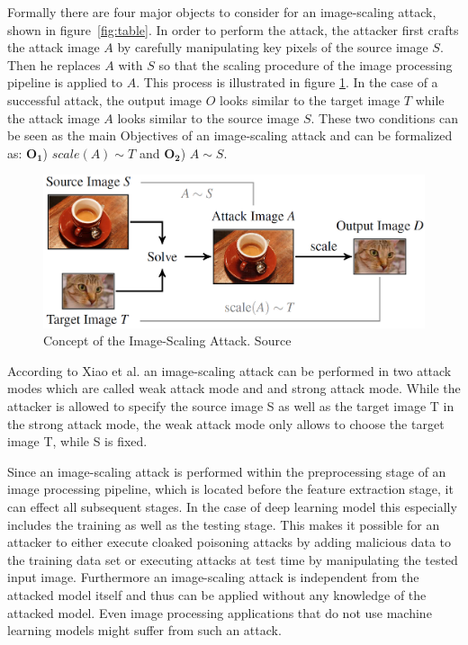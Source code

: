 \documentclass[sigconf]{acmart}
\begin{document}
Formally there are four major objects to consider for an image-scaling attack, shown in figure~\ref{fig:table}.
In order to perform the attack, the attacker first crafts the attack image $A$ by carefully manipulating key pixels of the source image $S$.
Then he replaces $A$ with $S$ so that the scaling procedure of the image processing pipeline is applied to $A$.
This process is illustrated in figure \ref{fig:conc}.
In the case of a successful attack, the output image $O$ looks similar to the target image $T$ while the attack image $A$ looks similar to the source image $S$.
These two conditions can be seen as the main Objectives of an image-scaling attack and can be formalized as:
$\boldsymbol{O_1}$) $scale(A) \sim T$ and $\boldsymbol{O_2}$) $A \sim S$.

\begin{figure}[h]
  \centering
  \includegraphics[width=\linewidth]{img/img_scale_concept.png}
  \caption{Concept of the Image-Scaling Attack. Source \cite{imgscale}}
  \Description{}
  \label{fig:conc}
\end{figure}

According to Xiao et al.\cite{camouflage} an image-scaling attack can be performed in two attack modes which are called weak attack mode and and strong attack mode.
While the attacker is allowed to specify the source image S as well as the target image T in the strong attack mode, the weak attack mode only allows to choose the target image T, while S is fixed.

Since an image-scaling attack is performed within the preprocessing stage of an image processing pipeline, which is located before the feature extraction stage, it can effect all subsequent stages.
In the case of deep learning model this especially includes the training as well as the testing stage.
This makes it possible for an attacker to either execute cloaked poisoning attacks by adding malicious data to the training data set or executing attacks at test time by manipulating the tested input image.
Furthermore an image-scaling attack is independent from the attacked model itself and thus can be applied without any knowledge of the attacked model.
Even image processing applications that do not use machine learning models might suffer from such an attack.
\end{document}
